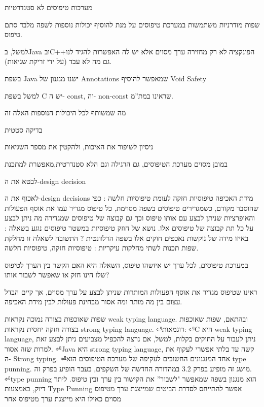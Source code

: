       מערכות טיפוסים לא סטנדרטיות
      \begin{ציינון}
\item שפות מודרניות משתמשות במערכת טיפוסים על מנת להוסיף יכולות נוספות לשפה מלבד סתם טיפוס.
\item למשל, בJava ובC++הפונקציה לא רק מחזירה ערך מסוים אלא יש לה האפשרות להגיד לנו גם מה לא עבד (על ידי זריקת שגיאות).
\item בשפת Java ישנו מנגנון של Annotations שמאפשר להוסיף Void Safety
\item למשל בשפת C יש ה- const, וה- non-const שראינו במת”מ.
\item מה שמשותף לכל היכולות הנוספות האלה זה
\item בדיקה סטטית
\item ניסיון לשיפור את האיכות, ולהקטין את מספר השגיאות
\item במובן מסוים מערכת הטיפוסים, גם הרגילה וגם הלא סטנדרטית,מאפשרת למתכנת
\item לבטא את ה-design decision
\item לאכוף את ה-design decisions
      מידת האכיפה
      טיפוסיות חזקה לעומת טיפוסיות חלשה : כפי שהוסבר מקודם, כשמגדירים טיפוסים בשפה מסוימת, כל טיפוס מגדיר עמו את אוסף הפעולות והאופרציות שניתן לבצע עם אותו טיפוס וכך גם קבוצה של טיפוסים שמגדירה מה ניתן לבצע על כל תת קבוצה של טיפוסים אלו. נושא של חוזק טיפוסיות במשטר טיפוסים נוגע בשאלה : באיזו מידה של נוקשות נאכפים חוקים אלו בשפה הרלוונטית ?
      התשובה לשאלה זו מחלקת שפות תכנות לשתי מחלקות עיקריות : טיפוסיות חזקה, טיפוסיות חלשה.
  \end{ציינון}

  \begin{ציינון}
\item במערכת טיפוסים, לכל ערך יש איזשהו טיפוס, השאלה היא האם הקשר בין הערך לטיפוס שלו הינו חזק או שאפשר לשבור אותו?
\item ראינו שטיפוס מגדיר את אוסף הפעולות המותרות שניתן לבצע על ערך מסוים, אך קיים הבדל עצום בין מה מותר ומה אסור מבחינת פעולות לבין מידת האכיפה.
\item שפות שאוכפות בצורה נמוכה נקראות weak typing language. ובהתאם, שפות שאוכפות בצורה חזקה יחסית נקראות strong typing language.
⏎דוגמאות:
⏎C היא weak typing language, ניתן לעבור על החוקים בקלות, למשל, אם נרצה להכפיל מצביעים ניתן לבצע זאת למרות שזה אסור.
⏎Java היא strong typing language, קשה עד בלתי אפשרי לעקוף את ה- Strong typing.
⏎אחד המנגנונים החשובים לעקיפה של מערכת הטיפוסים הוא type punning. מושג זה מופיע בפרק 3.2 במהדורה החדשה של השקפים, בעבר הופיע בפרק זה.
⏎type punning הוא מנגנון בשפה שמאפשר "לשבור” את הקישור בין ערך ובין טיפוס. ליתר דיוק, באמצעות Type Punning אפשר להתייחס לסדרת הביטים שמייצגת ערך מטיפוס מסוים כאילו היא מייצגת ערך מטיפוס אחר
    \end{ציינון}

